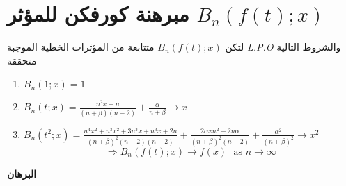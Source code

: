 \newpage
\section{مبرهنة كورفكن للمؤثر $B_n(f(t); x)$}
لتكن $B_n(f(t);x)$ متتابعة من المؤثرات الخطية الموجبة \textit{L.P.O} والشروط التالية متحققة 
\begin{english}
	\begin{enumerate}[label=\arabic*)]
		\item $B_n(1; x) =1$
		\item $B_n(t; x) = \frac{n^2x + n}{(n+ \beta)(n-2)} + \frac{\alpha}{n + \beta} \to x$
		\item $B_n(t^2; x) = \frac{n^4x^2 + n^3x^2 + 3n^3x + n^3 x + 2n}{(n+\beta)^2 (n-2)(n-2)} + \frac{2\alpha x n^2 + 2n \alpha}{(n+\beta)^2 (n-2)} + \frac{\alpha^2 }{(n+\beta)^2} \to x^2$
		\[
		\Rightarrow B_n(f(t); x) \to f(x)\,\, \text{ as $n \to \infty$}
		\]
	\end{enumerate}
\end{english}
\noindent
\textbf{{البرهان}}	

